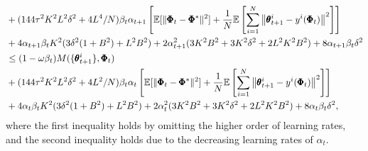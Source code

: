 \documentclass{article} %
\theoremstyle{plain}
\theoremstyle{definition}
\theoremstyle{remark}
\begin{document}
{\begin{align}
&+(144\tau^2K^2L^2\delta^2+4L^4/N)\beta_t\alpha_{t+1}\left[\mathbb{E}[\|\pmb{\Phi}_t-\pmb{\Phi}^*\|^2]+\frac{1}{N}\mathbb{E}\left[\sum_{i=1}^N\left\|\pmb{\theta}_{t+1}^i-y^i(\pmb{\Phi}_{t})\right\|^2 \right]\right]\nonumber\allowdisplaybreaks\\
&+4\alpha_{t+1}\beta_tK^2(3\delta^2(1+B^2)+L^2B^2)+2\alpha_{t+1}^2(3K^2B^2+3K^2\delta^2+2L^2K^2B^2)+8\alpha_{t+1}\beta_t\delta^2 \nonumber\allowdisplaybreaks\\
&\leq (1-\omega\beta_t)M(\{\pmb{\theta}_{t+1}^i\}, \pmb{\Phi}_{t})\nonumber\allowdisplaybreaks\\
&+(144\tau^2K^2L^2\delta^2+4L^2/N)\beta_t\alpha_t\left[\mathbb{E}[\|\pmb{\Phi}_t-\pmb{\Phi}^*\|^2]+\frac{1}{N}\mathbb{E}\left[\sum_{i=1}^N\left\|\pmb{\theta}_{t+1}^i-y^i(\pmb{\Phi}_{t})\right\|^2 \right]\right]\nonumber\allowdisplaybreaks\\
&+4\alpha_{t}\beta_tK^2(3\delta^2(1+B^2)+L^2B^2)+2\alpha_{t}^2(3K^2B^2+3K^2\delta^2+2L^2K^2B^2)+8\alpha_{t}\beta_t\delta^2, 
\end{align}
where the first inequality holds by omitting the higher order of learning rates, and the second inequality holds due to the decreasing learning rates of $\alpha_t$.

}
\end{document}

